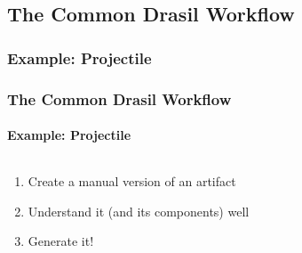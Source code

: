 \subsection{The Common Drasil Workflow}
\subsubsection*{Example: Projectile}

\begin{frame}
    \frametitle{The Common Drasil Workflow}
    \framesubtitle{Example: Projectile}

    \begin{columns}[T,onlytextwidth]
        \begin{column}{.25\textwidth}
            \begin{enumerate}
                \item<2-|handout:1-> Create a manual version of an artifact
                \item<3-|handout:2-> Understand it (and its components) well
                \item<4-|handout:3> Generate it!
            \end{enumerate}
        \end{column}
        \begin{column}{.75\textwidth}
        \end{column}
    \end{columns}


\end{frame}
